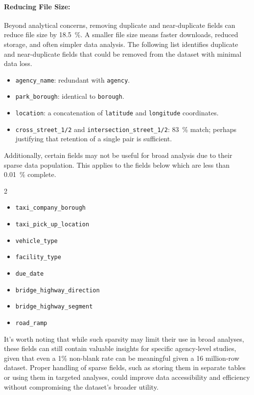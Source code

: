 \documentclass[linenumber]{jdsart}
\begin{document}
\paragraph{Reducing File Size:}
\label{par:filesize}
Beyond analytical concerns, removing duplicate and near-duplicate fields 
can reduce file size by \SI{18.5}{\percent}. A smaller file size 
means faster downloads, reduced storage, and often simpler data analysis. 
The following list identifies duplicate and near-duplicate fields that 
could be removed from the dataset with minimal data loss.


\begin{itemize}[left=1.5em,itemsep=0.1\baselineskip]
  \item \texttt{agency\_name}: redundant with \texttt{agency}.
  \item \texttt{park\_borough}: identical to \texttt{borough}.
  \item \texttt{location}: a concatenation of \texttt{latitude} and \texttt{longitude} coordinates.
  \item \texttt{cross\_street\_1/2} and \texttt{intersection\_street\_1/2}: 
 \SI{83}{\percent} match; perhaps justifying that retention of a single pair is sufficient.

\end{itemize}

Additionally, certain fields may not be useful for broad analysis
due to their sparse data population. This applies to the fields 
below which are less than \SI{0.01}{\percent} complete.

\begin{multicols}{2}
\begin{itemize}[left=1.5em]
    \item \texttt{taxi\_company\_borough}
    \item \texttt{taxi\_pick\_up\_location}
    \item \texttt{vehicle\_type}
    \item \texttt{facility\_type}
    \item \texttt{due\_date}
    \item \texttt{bridge\_highway\_direction}
    \item \texttt{bridge\_highway\_segment}
    \item \texttt{road\_ramp}
\end{itemize}
\end{multicols}

It's worth noting that while such sparsity may limit their use in 
broad analyses, these fields can still contain valuable insights 
for specific agency-level studies, given that even a 1\% 
non-blank rate can be meaningful given a \num{16} million-row 
dataset. Proper handling of sparse fields, 
such as storing them in separate tables or using them in 
targeted analyses, could improve data accessibility and 
efficiency without compromising the dataset’s broader utility.
\end{document}
